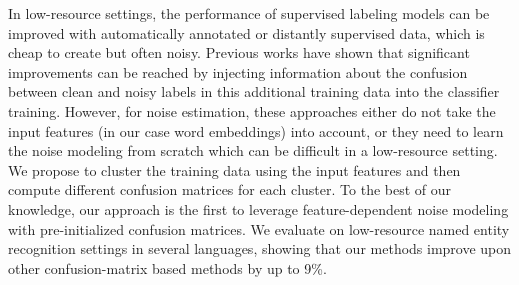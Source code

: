 In low-resource settings, the performance of supervised labeling models can be improved with automatically annotated or distantly supervised data, which is cheap to create but often noisy.
Previous works have shown that significant improvements can be reached by injecting information about the confusion between clean and noisy labels in this additional training data into the classifier training. 
However, for noise estimation, these approaches either do not take the input features (in our case word embeddings) into account, or they need to learn the noise modeling from scratch which can be difficult in a low-resource setting. 
We propose to cluster the training data using the input features and then compute different confusion matrices for each cluster. To the best of our knowledge, our approach is the first to leverage feature-dependent noise modeling with pre-initialized confusion matrices.
We evaluate on low-resource named entity recognition settings in several languages, showing that our methods improve upon other confusion-matrix based methods by up to 9\%.